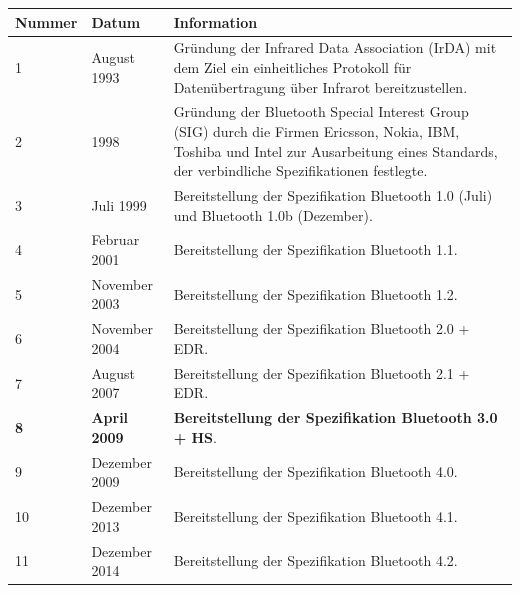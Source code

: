 \vspace{-0.3cm}
\begin{tabular}{|p{1 cm}|p{3 cm}|p{13.55 cm}|}
	\hline
	Nummer & Datum & Information \\
	\hline
	1 & August 1993 & Gründung der Infrared Data Association (IrDA) mit dem Ziel ein einheitliches Protokoll für Datenübertragung über Infrarot bereitzustellen.\\
	\hline
	2 & 1998 & Gründung der Bluetooth Special Interest Group (SIG) durch die Firmen Ericsson, Nokia, IBM, Toshiba und Intel zur Ausarbeitung eines Standards, der verbindliche Spezifikationen festlegte.\\
	\hline
	3 & Juli 1999 & Bereitstellung der Spezifikation Bluetooth 1.0 (Juli) und Bluetooth 1.0b (Dezember).\\
	\hline
	4 & Februar 2001 & Bereitstellung der Spezifikation Bluetooth 1.1.\\
	\hline
	5 & November 2003 & Bereitstellung der Spezifikation Bluetooth 1.2.\\
	\hline
	6 & November 2004 & Bereitstellung der Spezifikation Bluetooth 2.0 + EDR.\\
	\hline
	7 & August 2007 & Bereitstellung der Spezifikation Bluetooth 2.1 + EDR.\\
	\hline
	\textbf{8} & \textbf{April 2009} & \textbf{Bereitstellung der Spezifikation Bluetooth 3.0 + HS}.\\
	\hline
	9 & Dezember 2009 & Bereitstellung der Spezifikation Bluetooth 4.0.\\
	\hline
	10 & Dezember 2013 & Bereitstellung der Spezifikation Bluetooth 4.1.\\
	\hline
	11 & Dezember 2014 & Bereitstellung der Spezifikation Bluetooth 4.2.\\
	\hline
\end{tabular}
